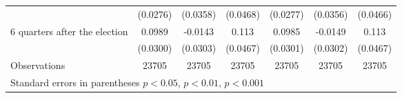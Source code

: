 \begin{table}[!ht]
\begin{tabular}{l*{6}{c}}
                    &    (0.0276)         &    (0.0358)         &    (0.0468)         &    (0.0277)         &    (0.0356)         &    (0.0466)         \\
[0.5em]
 6 quarters after the election&      0.0989\sym{***}&     -0.0143         &       0.113\sym{*}  &      0.0985\sym{**} &     -0.0149         &       0.113\sym{*}  \\
                    &    (0.0300)         &    (0.0303)         &    (0.0467)         &    (0.0301)         &    (0.0302)         &    (0.0467)         \\
\hline
Observations        &       23705         &       23705         &       23705         &       23705         &       23705         &       23705         \\
\hline\hline
\multicolumn{7}{l}{ Standard errors in parentheses \sym{*} \(p<0.05\), \sym{**} \(p<0.01\), \sym{***} \(p<0.001\)}\\
\end{tabular}
\end{table}
